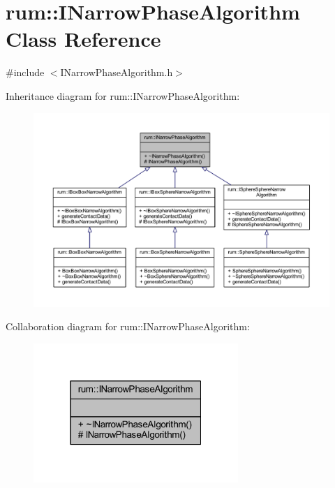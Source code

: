 \hypertarget{classrum_1_1_i_narrow_phase_algorithm}{}\section{rum\+:\+:I\+Narrow\+Phase\+Algorithm Class Reference}
\label{classrum_1_1_i_narrow_phase_algorithm}


{\ttfamily \#include $<$I\+Narrow\+Phase\+Algorithm.\+h$>$}



Inheritance diagram for rum\+:\+:I\+Narrow\+Phase\+Algorithm\+:\nopagebreak
\begin{figure}[H]
\begin{center}
\leavevmode
\includegraphics[width=350pt]{classrum_1_1_i_narrow_phase_algorithm__inherit__graph}
\end{center}
\end{figure}


Collaboration diagram for rum\+:\+:I\+Narrow\+Phase\+Algorithm\+:\nopagebreak
\begin{figure}[H]
\begin{center}
\leavevmode
\includegraphics[width=220pt]{classrum_1_1_i_narrow_phase_algorithm__coll__graph}
\end{center}
\end{figure}
